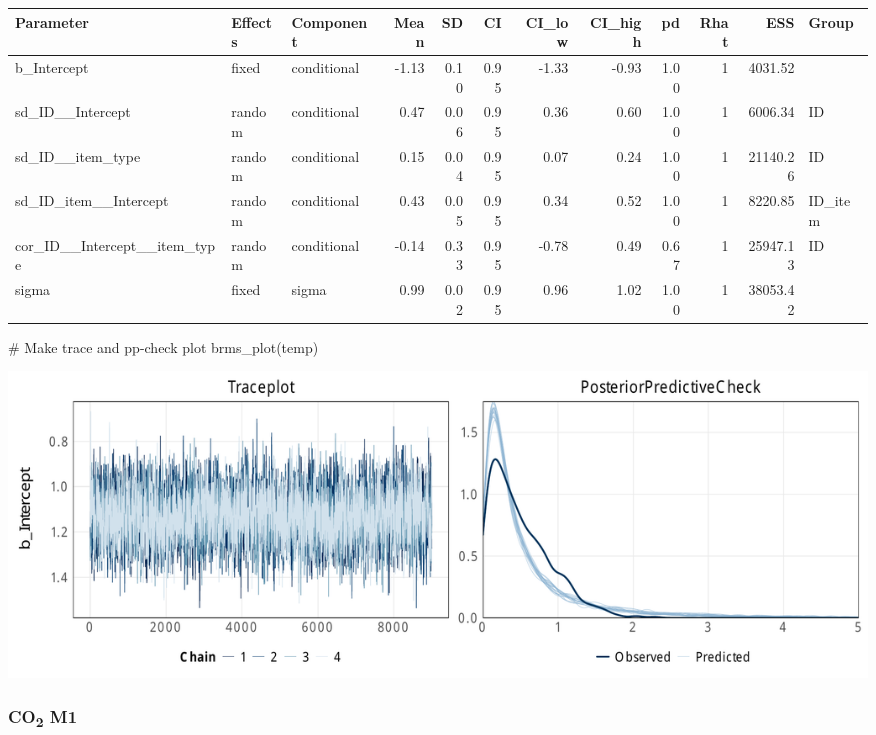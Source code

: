 \documentclass[
  letterpaper,
  DIV=11,
  numbers=noendperiod]{scrartcl}
\newenvironment{Shaded}{\begin{snugshade}}{\end{snugshade}}
\newcommand{\AttributeTok}[1]{\textcolor[rgb]{0.40,0.45,0.13}{#1}}
\newcommand{\CommentTok}[1]{\textcolor[rgb]{0.37,0.37,0.37}{#1}}
\newcommand{\FunctionTok}[1]{\textcolor[rgb]{0.28,0.35,0.67}{#1}}
\newcommand{\NormalTok}[1]{\textcolor[rgb]{0.00,0.23,0.31}{#1}}
\newcommand{\OtherTok}[1]{\textcolor[rgb]{0.00,0.23,0.31}{#1}}
\newcommand{\SpecialCharTok}[1]{\textcolor[rgb]{0.37,0.37,0.37}{#1}}
\newcommand{\StringTok}[1]{\textcolor[rgb]{0.13,0.47,0.30}{#1}}
\begin{document}
\begin{longtable*}[t]{lllrrrrrrrrl}
\toprule
Parameter & Effects & Component & Mean & SD & CI & CI\_low & CI\_high & pd & Rhat & ESS & Group\\
\midrule
b\_Intercept & fixed & conditional & -1.13 & 0.10 & 0.95 & -1.33 & -0.93 & 1.00 & 1 & 4031.52 & \\
sd\_ID\_\_Intercept & random & conditional & 0.47 & 0.06 & 0.95 & 0.36 & 0.60 & 1.00 & 1 & 6006.34 & ID\\
sd\_ID\_\_item\_type & random & conditional & 0.15 & 0.04 & 0.95 & 0.07 & 0.24 & 1.00 & 1 & 21140.26 & ID\\
sd\_ID\_item\_\_Intercept & random & conditional & 0.43 & 0.05 & 0.95 & 0.34 & 0.52 & 1.00 & 1 & 8220.85 & ID\_item\\
cor\_ID\_\_Intercept\_\_item\_type & random & conditional & -0.14 & 0.33 & 0.95 & -0.78 & 0.49 & 0.67 & 1 & 25947.13 & ID\\
\addlinespace
sigma & fixed & sigma & 0.99 & 0.02 & 0.95 & 0.96 & 1.02 & 1.00 & 1 & 38053.42 & \\
\bottomrule
\end{longtable*}

\begin{Shaded}
\begin{Highlighting}[]
\CommentTok{\# Make trace and pp{-}check plot}
\FunctionTok{brms\_plot}\NormalTok{(temp)}
\end{Highlighting}
\end{Shaded}

\includegraphics{supplement_files/figure-pdf/h2aM0CO2-1.pdf}

\subsubsection{\texorpdfstring{CO\textsubscript{2}
M1}{CO2 M1}}\label{co2-m1-2}

\begin{Shaded}
\end{Shaded}
\end{document}
